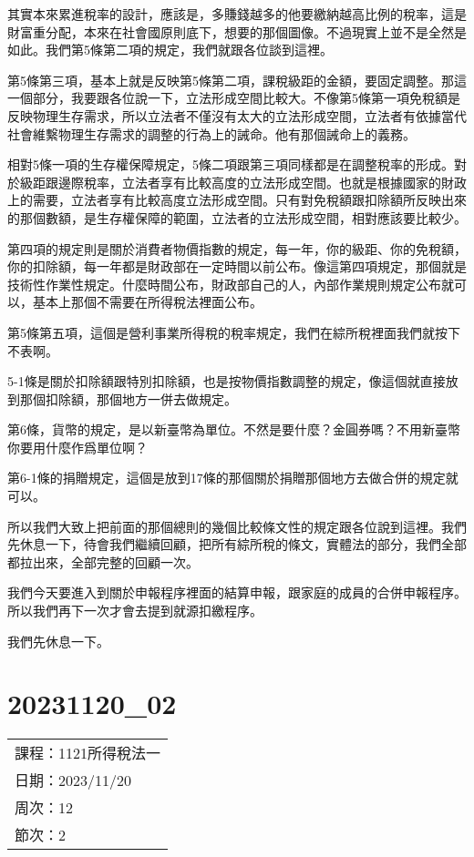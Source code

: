 \documentclass[]{ctexbook}
\begin{document}
其實本來累進稅率的設計，應該是，多賺錢越多的他要繳納越高比例的稅率，這是財富重分配，本來在社會國原則底下，想要的那個圖像。不過現實上並不是全然是如此。我們第5條第二項的規定，我們就跟各位談到這裡。

第5條第三項，基本上就是反映第5條第二項，課稅級距的金額，要固定調整。那這一個部分，我要跟各位說一下，立法形成空間比較大。不像第5條第一項免稅額是反映物理生存需求，所以立法者不僅沒有太大的立法形成空間，立法者有依據當代社會維繫物理生存需求的調整的行為上的誡命。他有那個誡命上的義務。

相對5條一項的生存權保障規定，5條二項跟第三項同樣都是在調整稅率的形成。對於級距跟邊際稅率，立法者享有比較高度的立法形成空間。也就是根據國家的財政上的需要，立法者享有比較高度立法形成空間。只有對免稅額跟扣除額所反映出來的那個數額，是生存權保障的範圍，立法者的立法形成空間，相對應該要比較少。

第四項的規定則是關於消費者物價指數的規定，每一年，你的級距、你的免稅額，你的扣除額，每一年都是財政部在一定時間以前公布。像這第四項規定，那個就是技術性作業性規定。什麼時間公布，財政部自己的人，內部作業規則規定公布就可以，基本上那個不需要在所得稅法裡面公布。

第5條第五項，這個是營利事業所得稅的稅率規定，我們在綜所稅裡面我們就按下不表啊。

5-1條是關於扣除額跟特別扣除額，也是按物價指數調整的規定，像這個就直接放到那個扣除額，那個地方一併去做規定。

第6條，貨幣的規定，是以新臺幣為單位。不然是要什麼？金圓券嗎？不用新臺幣你要用什麼作爲單位啊？

第6-1條的捐贈規定，這個是放到17條的那個關於捐贈那個地方去做合併的規定就可以。

所以我們大致上把前面的那個總則的幾個比較條文性的規定跟各位說到這裡。我們先休息一下，待會我們繼續回顧，把所有綜所稅的條文，實體法的部分，我們全部都拉出來，全部完整的回顧一次。

我們今天要進入到關於申報程序裡面的結算申報，跟家庭的成員的合併申報程序。所以我們再下一次才會去提到就源扣繳程序。

我們先休息一下。

\hypertarget{section-22}{%
\chapter{20231120\_02}\label{section-22}}

\begin{longtable}[]{@{}l@{}}
\toprule()
\endhead
課程：1121所得稅法一 \\
日期：2023/11/20 \\
周次：12 \\
節次：2 \\
\bottomrule()
\end{longtable}
\end{document}
